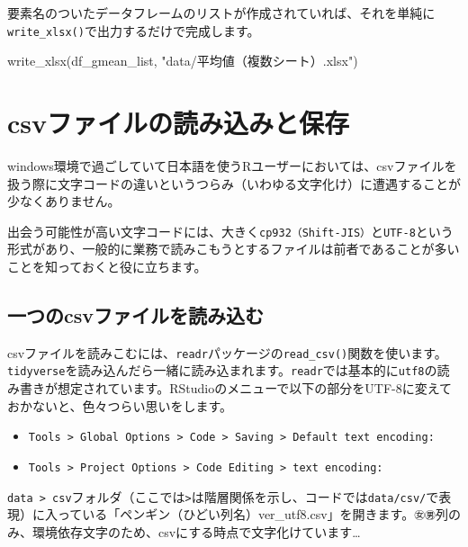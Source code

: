 \documentclass[
  xelatex,ja=standard, b5paper]{bxjsbook}
\newenvironment{Shaded}{\begin{snugshade}}{\end{snugshade}}
\newcommand{\FunctionTok}[1]{\textcolor[rgb]{0.00,0.00,0.00}{#1}}
\newcommand{\NormalTok}[1]{#1}
\newcommand{\StringTok}[1]{\textcolor[rgb]{0.31,0.60,0.02}{#1}}
\providecommand{\tightlist}{%
  \setlength{\itemsep}{0pt}\setlength{\parskip}{0pt}}
\begin{document}
要素名のついたデータフレームのリストが作成されていれば、それを単純に\texttt{write\_xlsx()}で出力するだけで完成します。

\begin{Shaded}
\begin{Highlighting}[]
\FunctionTok{write\_xlsx}\NormalTok{(df\_gmean\_list, }\StringTok{"data/平均値（複数シート）.xlsx"}\NormalTok{)}
\end{Highlighting}
\end{Shaded}

\hypertarget{readsavecsv}{%
\chapter{csvファイルの読み込みと保存}\label{readsavecsv}}

windows環境で過ごしていて日本語を使うRユーザーにおいては、csvファイルを扱う際に文字コードの違いというつらみ（いわゆる文字化け）に遭遇することが少なくありません。

出会う可能性が高い文字コードには、大きく\texttt{cp932（Shift-JIS）}と\texttt{UTF-8}という形式があり、一般的に業務で読みこもうとするファイルは前者であることが多いことを知っておくと役に立ちます。

\hypertarget{ux4e00ux3064ux306ecsvux30d5ux30a1ux30a4ux30ebux3092ux8aadux307fux8fbcux3080}{%
\section{一つのcsvファイルを読み込む}\label{ux4e00ux3064ux306ecsvux30d5ux30a1ux30a4ux30ebux3092ux8aadux307fux8fbcux3080}}

csvファイルを読みこむには、\texttt{readr}パッケージの\texttt{read\_csv()}関数を使います。\texttt{tidyverse}を読み込んだら一緒に読み込まれます。\texttt{readr}では基本的に\texttt{utf8}の読み書きが想定されています。RStudioのメニューで以下の部分をUTF-8に変えておかないと、色々つらい思いをします。

\begin{itemize}
\tightlist
\item
  \texttt{Tools\ \textgreater{}\ Global\ Options\ \textgreater{}\ Code\ \textgreater{}\ Saving\ \textgreater{}\ Default\ text\ encoding:}
\item
  \texttt{Tools\ \textgreater{}\ Project\ Options\ \textgreater{}\ Code\ Editing\ \textgreater{}\ text\ encoding:}
\end{itemize}

\texttt{data\ \textgreater{}\ csv}フォルダ（ここでは\texttt{\textgreater{}}は階層関係を示し、コードでは\texttt{data/csv/}で表現）に入っている「ペンギン（ひどい列名）ver\_utf8.csv」を開きます。\texttt{㊛㊚}列のみ、環境依存文字のため、csvにする時点で文字化けています\ldots{}
\end{document}
